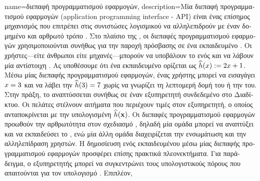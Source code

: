 {name={\foreignlanguage{greek}{διεπαφή προγραμματισμού εφαρμογών}},
	description={\foreignlanguage{greek}{Μία διεπαφή προγραμματι\-σμού εφαρμογών} (application programming interface - API) \foreignlanguage{greek}{είναι ένας επίσημος μηχανισμός που επιτρέπει στις συνιστώσες 
		λογισμικού να αλληλεπιδρούν με έναν δομημένο και αρθρωτό τρόπο} \cite{RestfulBook2013}.
		\foreignlanguage{greek}{Στο πλαίσιο της} , \foreignlanguage{greek}{οι διεπαφές προγραμματισμού εφαρμογών 
		χρησιμοποι\-ού\-νται συνήθως για την παροχή πρόσβασης σε ένα εκπαιδευμένο}  . 
		\foreignlanguage{greek}{Οι χρήστες—είτε άνθρωποι είτε μηχανές—μπορούν να υποβάλουν το}  
		\foreignlanguage{greek}{ενός}  \foreignlanguage{greek}{και να λάβουν μία αντίστοιχη} . 
		\foreignlanguage{greek}{Ας υποθέσουμε ότι ένα εκπαιδευμένο}   \foreignlanguage{greek}{ορίζεται ως  
		$\widehat{h}(x) := 2 x + 1$. Μέσω μίας διεπαφής προγραμματισμού εφαρμογών, ένας χρήστης μπορεί να 
		εισαγάγει $x = 3$ και να λάβει την}  $\widehat{h}(3) = 7$ \foreignlanguage{greek}{χωρίς να γνωρίζει τη 
		λεπτομερή δομή του}   \foreignlanguage{greek}{ή την}  \foreignlanguage{greek}{του. 
		Στην πράξη, το}  \foreignlanguage{greek}{αναπτύσσεται συνήθως σε έναν εξυπηρετητή συνδεδεμένο στο Διαδίκτυο. 
		Οι πελάτες στέλνουν αιτήματα που περιέχουν τιμές}  \foreignlanguage{greek}{στον εξυπηρετητή, ο οποίος 
		ανταποκρίνεται με την υπολογισμένη}  $\widehat{h}({\bf x})$. \foreignlanguage{greek}{Οι διεπαφές 
		προγραμματισμού εφαρμογών προωθούν την αρθρωτότητα στον σχεδιασμό} , \foreignlanguage{greek}{δηλαδή 
		μία ομάδα μπορεί να αναπτύξει και να εκπαιδεύσει το} , \foreignlanguage{greek}{ενώ μία άλλη ομάδα διαχειρίζεται 
		την ενσωμάτωση και την αλληλεπίδραση χρηστών. Η δημοσίευση ενός εκπαιδευμένου}  \foreignlanguage{greek}{μέσω 
		μίας διεπαφής προγραμματισμού εφαρμογών προσφέρει επίσης πρακτικά πλεονεκτήματα. Για παράδειγμα, ο εξυπηρετητής μπορεί να 
		συγκεντρώνει τους υπολογιστικούς πόρους που απαιτούνται για τον υπολογισμό} . \foreignlanguage{greek}{Επιπλέον, 
}}}
